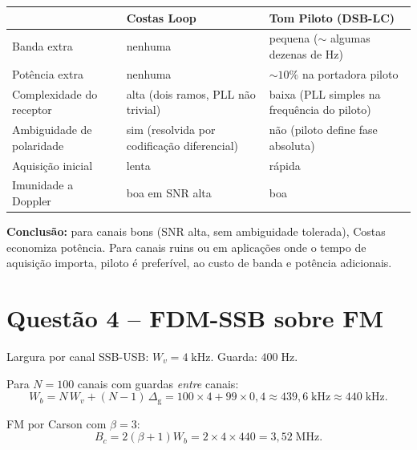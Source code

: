 \documentclass[11pt,a4paper]{article}
\begin{document}
\begin{resolucao}

\begin{center}
\small
\begin{tabular}{p{4.5cm}p{5cm}p{5cm}}
\toprule
& \textbf{Costas Loop} & \textbf{Tom Piloto (DSB-LC)} \\
\midrule
Banda extra & nenhuma & pequena ($\sim$ algumas dezenas de Hz) \\
Potência extra & nenhuma & $\sim 10\%$ na portadora piloto \\
Complexidade do receptor & alta (dois ramos, PLL não trivial) & baixa (PLL simples na frequência do piloto) \\
Ambiguidade de polaridade & sim (resolvida por codificação diferencial) & não (piloto define fase absoluta) \\
Aquisição inicial & lenta & rápida \\
Imunidade a Doppler & boa em SNR alta & boa \\
\bottomrule
\end{tabular}
\end{center}

\textbf{Conclusão:} para canais bons (SNR alta, sem ambiguidade tolerada), Costas economiza potência. Para canais ruins ou em aplicações onde o tempo de aquisição importa, piloto é preferível, ao custo de banda e potência adicionais.
\end{resolucao}

\section*{Questão 4 -- FDM-SSB sobre FM}

\begin{resolucao}

Largura por canal SSB-USB: $W_v = 4\;\text{kHz}$. Guarda: $400\;\text{Hz}$.

Para $N = 100$ canais com guardas \emph{entre} canais:
\[
  W_b = N\,W_v + (N-1)\,\Delta_{\text{g}} = 100\times 4 + 99 \times 0{,}4 \approx 439{,}6\;\text{kHz} \approx \boxed{440\;\text{kHz}.}
\]

FM por Carson com $\beta = 3$:
\[
  B_c = 2(\beta + 1) W_b = 2 \times 4 \times 440 = \boxed{3{,}52\;\text{MHz}.}
\]
\end{resolucao}
\end{document}
